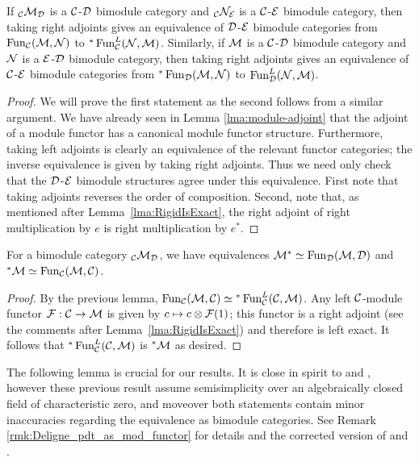 \documentclass{amsart}
\begin{document}
\begin{lemma}
If ${}_{\mathcal C}\mathcal M_\mathcal D$ is a $\mathcal C$-$\mathcal D$ bimodule category and ${}_{\mathcal C}\mathcal N_\mathcal E$ is a $\mathcal C$-$\mathcal E$ bimodule category, then taking right adjoints gives an equivalence of $\mathcal D$-$\mathcal E$ bimodule categories 
from $\operatorname{Fun}_{\mathcal C}(\mathcal M, \mathcal N)$ to ${}^*\operatorname{Fun}^L_{\mathcal C}(\mathcal N, \mathcal M)$.
Similarly, if $\mathcal M$ is a $\mathcal C$-$\mathcal D$ bimodule category and $\mathcal N$ is a $\mathcal E$-$\mathcal D$ bimodule category, then taking right adjoints gives an equivalence of $\mathcal C$-$\mathcal E$ bimodule categories from ${}^*\operatorname{Fun}_{\mathcal D}(\mathcal M, \mathcal N)$ to $\operatorname{Fun}^L_{\mathcal D}(\mathcal N, \mathcal M)$. 
\end{lemma}
\begin{proof}
	We will prove the first statement as the second follows from a similar argument. 
We have already seen in Lemma \ref{lma:module-adjoint} that the adjoint of a module functor has a canonical module functor structure.  Furthermore, taking left adjoints is clearly an equivalence of the relevant functor categories; the inverse equivalence is given by taking right adjoints. Thus we need only check that the $\mathcal D$-$\mathcal E$ bimodule structures agree under this equivalence.  First note that taking adjoints reverses the order of composition. Second, note that, as mentioned after Lemma~\ref{lma:RigidIsExact}, the right adjoint of right multiplication by $e$ is right multiplication by $e^*$.
\end{proof}

\begin{lemma} \label{lem:dual-formula-for-adjoints}
For a bimodule category ${}_\mathcal C \mathcal M_\mathcal D$, we have equivalences $\mathcal M^* \simeq \operatorname{Fun}_{\mathcal D}(\mathcal M, \mathcal D)$ and ${}^*\mathcal M \simeq \operatorname{Fun}_{\mathcal C}(\mathcal M, \mathcal C)$.
\end{lemma}
\begin{proof}
By the previous lemma, $\operatorname{Fun}_{\mathcal C}(\mathcal M, \mathcal C) \simeq {}^*\operatorname{Fun}_{\mathcal C}^L(\mathcal C, \mathcal M)$.  Any left $\mathcal C$-module functor $\mathcal F: \mathcal C \rightarrow \mathcal M$ is given by $c \mapsto c \otimes \mathcal F(1)$; this functor is a right adjoint (see the comments after Lemma~\ref{lma:RigidIsExact}) and therefore is left exact.  It follows that ${}^*\operatorname{Fun}_{\mathcal C}^L(\mathcal C, \mathcal M)$ is ${}^* \mathcal M$ as desired.
\end{proof}

The following lemma is crucial for our results. 
It is close in spirit to \cite[Prop. 3.5 and Rmk. 3.6]{0909.3140} and \cite[Thm. 3.20]{0911.4979}, however these previous result assume semisimplicity over an algebraically closed field of characteristic zero, and moveover both statements contain minor inaccuracies regarding the equivalence as bimodule categories. See Remark \ref{rmk:Deligne_pdt_as_mod_functor} for details and the corrected version of \cite[Rmk. 3.6]{0909.3140} and \cite[Thm. 3.20]{0911.4979}.
\end{document}
